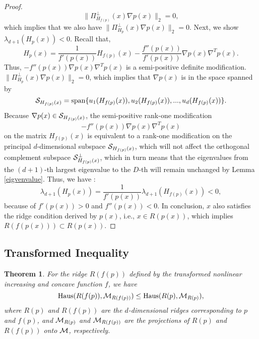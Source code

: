 \documentclass[aos,preprint]{imsart}
\newtheorem{theorem}{Theorem}[section]
\theoremstyle{remark}
\begin{document}
\begin{appendix}
\begin{proof}
\[
\|\Pi_{H_{f(p)}}^{\perp}(x)\nabla p(x)\|_2=0,
\] 
which implies that we also have $\|\Pi_{H_p}^\perp(x)\nabla p(x)\|_2=0$. Next, we show $\lambda_{d+1}(H_p(x)) < 0$. Recall that, 
\[
 H_{p}(x) =\frac{1}{ f'(p(x))} H_{f(p)}(x) - \frac{f''(p(x))}{ f'(p(x))} \nabla p(x) \nabla^T p(x) .
\]
 Thus, $-{f''(p(x))} \nabla p(x) \nabla^T p(x)$ is a semi-positive definite modification.
  $\|\Pi_{H_p}^\perp(x)\nabla p(x)\|_2=0$, which implies that $\nabla p(x)$ is in the space spanned by
 \[
 {\cal S}_{H_{f(p)}(x)} = {\rm span}\{ u_1(H_{f(p)}(x)), u_2(H_{f(p)}(x)),..., u_d(H_{f(p)}(x))\}.
 \]
 Because $\nabla p(x) \in  {\cal S}_{H_{f(p)}(x)}$, the semi-positive rank-one modification
 \[
 -{f''(p(x))} \nabla p(x) \nabla^T p(x)
 \] 
 on the matrix $H_{f(p)}(x)$ is equivalent to a rank-one modification on the principal $d$-dimensional subspace ${\cal S}_{H_{f(p)}(x)}$, which will not affect the orthogonal complement subspace ${\cal S}^\perp_{H_{f(p)}(x)}$, which in turn means that the
 eigenvalues from the $(d+1)$-th largest eigenvalue to the $D$-th will remain unchanged by Lemma \eqref{eigvenvalue}. %
Thus, we have :
\[
\lambda_{d+1}(H_p(x))  = \frac{1}{f'(p(x))} \lambda_{d+1}(H_{f(p)}(x)) < 0, %
\]
because of $f'(p(x))>0$ and ${f''(p(x))}<0$. %
In conclusion, $x$ also satisfies the ridge condition derived by $p(x)$, i.e., $x \in R({p(x)})$, which implies $R({f(p(x))}) \subset R({p(x)})$. 


\end{proof}
\subsection{Transformed Inequality}
\begin{theorem}\label{Transformed Inequality Theorem}
For the ridge $R(f(p))$ defined by the transformed nonlinear increasing and concave function $f$, we have
\[
{\rm Haus} (R(f(p)), {\cal M}_{R(f(p))}) \leq {\rm Haus} (R(p), {\cal M}_{R(p)}),
\]
where $R(p)$ and $R(f(p))$ are the $d$-dimensional ridges corresponding to $p$ and $f(p)$, and ${\cal M}_{R(p)}$ and ${\cal M}_{R(f(p))}$ are the projections of $R(p)$ and $R(f(p))$ onto $\cal M$, respectively.
\end{theorem}


\end{appendix}
\end{document}
